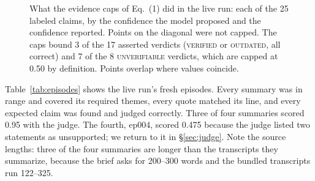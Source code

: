 \documentclass[11pt]{article}
\newcommand{\V}{\textsc{verified}}
\newcommand{\Ou}{\textsc{outdated}}
\newcommand{\U}{\textsc{unverifiable}}
\begin{document}
\begin{figure}[t]
\centering
{}
\caption{What the evidence caps of Eq.~(1) did in the live run: each of the 25 labeled claims, by the confidence the model proposed and the confidence reported. Points on the diagonal were not capped. The caps bound 3 of the 17 asserted verdicts (\V{} or \Ou{}, all correct) and 7 of the 8 \U{} verdicts, which are capped at 0.50 by definition. Points overlap where values coincide.}\label{fig:caps}
\end{figure}

Table~\ref{tab:episodes} shows the live run's fresh episodes. Every summary was in range and covered its required themes, every quote matched its line, and every expected claim was found and judged correctly. Three of four summaries scored 0.95 with the judge. The fourth, ep004, scored 0.475 because the judge listed two statements as unsupported; we return to it in \S\ref{sec:judge}. Note the source lengths: three of the four summaries are longer than the transcripts they summarize, because the brief asks for 200--300 words and the bundled transcripts run 122--325.
\end{document}
